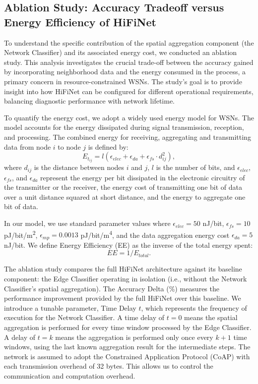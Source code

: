 \subsection{Ablation Study: Accuracy Tradeoff versus Energy Efficiency of HiFiNet}
To understand the specific contribution of the spatial aggregation component (the Network Classifier) and its associated energy cost, we conducted an ablation study. This analysis investigates the crucial trade-off between the accuracy gained by incorporating neighborhood data and the energy consumed in the process, a primary concern in resource-constrained WSNs. The study's goal is to provide insight into how HiFiNet can be configured for different operational requirements, balancing diagnostic performance with network lifetime.

To quantify the energy cost, we adopt a widely used energy model for WSNs. The model accounts for the energy dissipated during signal transmission, reception, and processing. The combined energy for receiving, aggregating and transmitting data from node \(i\) to node \(j\) is defined by:
\begin{equation}
  E_{t_{ij}} = l (\epsilon_{elec} + \epsilon_{da} + \epsilon_{fs} \cdot d^2_{ij}),
\end{equation}
where \(d_{ij}\) is the distance between nodes \(i\) and \(j\), \(l\) is the number of bits, and \(\epsilon_{elec}\), \(\epsilon_{fs}\), and \(\epsilon_{da}\) represent the energy per bit dissipated in the electronic circuitry of the transmitter or the receiver, the energy cost of transmitting one bit of data over a unit distance squared at short distance, and the energy to aggregate one bit of data.

In our model, we use standard parameter values where \(\epsilon_{elec} = 50\) \si{nJ/bit}, \(\epsilon_{fs} = 10\) \si{pJ/bit/m^2}, \(\epsilon_{mp} = 0.0013\) \si{pJ/bit/m^4}, and the data aggregation energy cost \(\epsilon_{da} = 5 \) \si{nJ/bit}. We define Energy Efficiency (EE) as the inverse of the total energy spent:
\begin{equation}
  EE = 1 / E_{total}.
\end{equation}

The ablation study compares the full HiFiNet architecture against its baseline component: the Edge Classifier operating in isolation (i.e., without the Network Classifier's spatial aggregation). The Accuracy Delta (\%) measures the performance improvement provided by the full HiFiNet over this baseline. We introduce a tunable parameter, Time Delay \(t\), which represents the frequency of execution for the Network Classifier. A time delay of \(t=0\) means the spatial aggregation is performed for every time window processed by the Edge Classifier. A delay of $t=k$ means the aggregation is performed only once every \(k+1\) time windows, using the last known aggregation result for the intermediate steps. The network is assumed to adopt the Constrained Application Protocol (CoAP) with each transmission overhead of 32 bytes. This allows us to control the communication and computation overhead.

